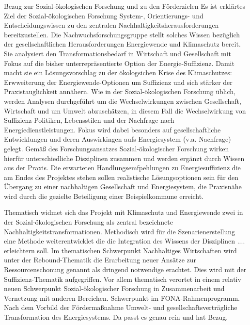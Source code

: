 Bezug zur Sozial-ökologischen Forschung und zu den Förderzielen
Es ist erklärtes Ziel der Sozial-ökologischen Forschung System-, Orientierungs- und Entscheidungswissen zu den zentralen Nachhaltigkeitsherausforderungen bereitzustellen. Die Nachwuchsforschungsgruppe stellt solches Wissen bezüglich der gesellschaftlichen Herausforderungen Energiewende und Klimaschutz bereit. Sie analysiert den Transformationsbedarf in Wirtschaft und Gesellschaft mit Fokus auf die bisher unterrepräsentierte Option der Energie-Suffizienz. Damit macht sie ein Lösungsvorschlag zu der ökologsichen Krise des Klimaschutzes: Erwweiterung der Energiewende-Optionen um Suffizienz und sich stärker der Praxistauglichkeit annähern. Wie in der Sozial-ökologischen Forschung üblich, werden Analysen durchgeführt um die Wechselwirkungen zwischen Gesellschaft, Wirtschaft und um Umwelt abzuschätzen, in diesem Fall die Wechselwirkung von Suffizienz-Politiken, Lebensstilen und der Nachfrage nach Energiedienstleistungen. Fokus wird dabei besonders auf gesellschaftliche Entwicklungen und deren Auswirkingen aufs Energiesystem (v.a. Nachfrage) gelegt. Gemäß des Forschungsansatzes Sozial-ökologischer Forschung wirken hierfür unterschiedliche Disziplinen zusammen und werden ergänzt durch Wissen aus der Praxis. Die erwarteten Handlungsemfpehlungen zu Energiesuffizienz die am Endes des Projektes stehen sollen realistische Lösungsoptionen sein für den Übergang zu einer nachhaltigen Gesellschaft und Energiesystem, die Praxisnähe wird durch die gezielte Beteiligung einer Beispielkommune erreicht.

Thematisch widmet sich das Projekt mit Klimaschutz und Energiewende zwei in der Sozial-ökologischen Forschung als zentral bezeichnete Nachhaltigkeitstransformationen. Methodisch wird für die Szenarienerstellung eine Methode weiterentwicklet die die Integration des Wissens der Disziplinen .... erleichtern soll.
Im thematischen Schwerpunkt Nachhaltiges Wirtschaften wird unter der Rebound-Thematik die Erarbeitung neuer Ansätze zur Ressourcenschonung genannt als dringend notwendige erachtet. Dies wird mit der Suffizienz-Thematik aufgegriffen.
Vor allem thematisch verortet in einem relativ neuen Schwerpunkt Sozial-ökologischer Forschung in Zusammenarbeit und Vernetzung mit anderen Bereichen. Schwerpunkt im FONA-Rahmenprogramm. Nach dem Vorbild der Fördermaßnahme Umwelt- und gesellschaftsverträgliche Transformation des Energiesystems. Da passt es genau rein und hat Bezug. 

